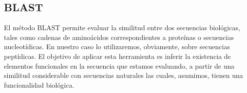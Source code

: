\subsection{BLAST}\label{blast}

El método BLAST permite evaluar la similitud entre dos secuencias biológicas, tales como cadenas de aminoácidos correspondientes a proteínas o secuencias nucleotídicas.
En nuestro caso lo utilizaremos, obviamente, sobre secuencias peptídicas.
El objetivo de aplicar esta herramienta es inferir la existencia de elementos funcionales en la secuencia que estamos evaluando, a partir de una similitud considerable con secuencias naturales
las cuales, asumimos, tienen una funcionalidad biológica.

% 
% 


